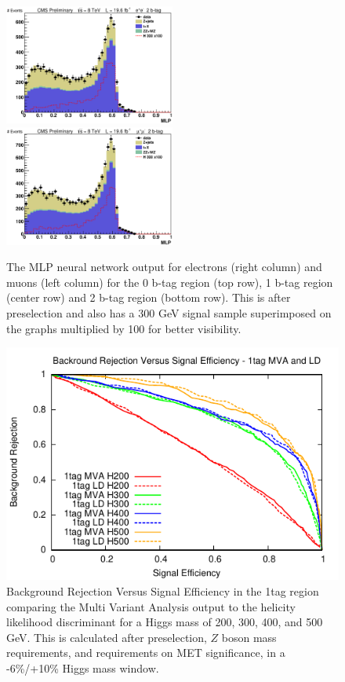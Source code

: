 \begin{figure}[htb!]
{  }
\centerline{
    \includegraphics[width=0.5\textwidth]{presentation/defense/images/preselection/2/el/MLP.eps}
    \includegraphics[width=0.5\textwidth]{presentation/defense/images/preselection/2/mu/MLP.eps}
  }
  \caption{
    The MLP neural network output for electrons (right column) and muons (left column) for the 0 b-tag region (top row), 1 b-tag region (center row) and 2 b-tag region (bottom row).  This is after preselection and also has a 300 GeV signal sample superimposed on the graphs multiplied by 100 for better visibility.
  }
  \label{fig:0tag_mlp}
\end{figure}






\begin{figure}[htb!]
\begin{center}
\centerline{
\includegraphics[width=0.6\linewidth]{Optimization/plots/NN/1tag_MVA_LD_ROC.pdf}
}
\caption{
Background Rejection Versus Signal Efficiency in the 1tag region comparing the Multi Variant Analysis output to the helicity likelihood discriminant for a Higgs mass of 200, 300, 400, and 500 GeV. This is calculated after preselection, $Z$ boson mass requirements, and requirements on MET significance, in a -6\%/+10\% Higgs mass window.
}
\label{fig:nn_1tag_ROC}
\end{center}
\end{figure}

